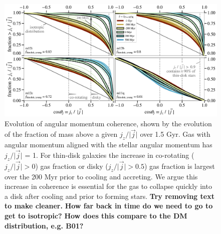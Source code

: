 \documentclass[fleqn,usenatbib]{mnras}
\begin{document}
\begin{figure}
    \centering
    \includegraphics[width=\textwidth]{figures/jzjmag_vs_t.pdf}
    \caption{
    Evolution of angular momentum coherence, shown by the evolution of the fraction of mass above a given $j_z / \vert \vec j \vert$ over 1.5 Gyr.
    Gas with angular momentum aligned with the stellar angular momentum has $j_z / \vert \vec j \vert$ = 1.
    For thin-disk galaxies the increase in co-rotating ($j_z/\vert \vec j \vert > 0$) gas fraction or disky ($j_z/\vert \vec j \vert > 0.5$) gas fraction is largest over the 200 Myr prior to cooling and accreting.
    We argue this increase in coherence is essential for the gas to collapse quickly into a disk after cooling and prior to forming stars.
    \textbf{Try removing text to make cleaner.}
    \textbf{How far back in time do we need to go to get to isotropic?}
    \textbf{How does this compare to the DM distribution, e.g. B01?}
    }
    \label{f: coherence}
\end{figure}
\end{document}

